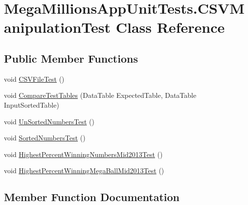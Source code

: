 \hypertarget{class_mega_millions_app_unit_tests_1_1_c_s_v_manipulation_test}{}\section{Mega\+Millions\+App\+Unit\+Tests.\+C\+S\+V\+Manipulation\+Test Class Reference}
\label{class_mega_millions_app_unit_tests_1_1_c_s_v_manipulation_test}
\subsection*{Public Member Functions}
\begin{DoxyCompactItemize}
\item 
void \hyperlink{class_mega_millions_app_unit_tests_1_1_c_s_v_manipulation_test_ad6a4b7ca874f3df6757bf6e1ce4b21c3}{C\+S\+V\+File\+Test} ()
\item 
void \hyperlink{class_mega_millions_app_unit_tests_1_1_c_s_v_manipulation_test_ae39c1add0a8ef2e94b35b41b8dea9a2d}{Compare\+Test\+Tables} (Data\+Table Expected\+Table, Data\+Table Input\+Sorted\+Table)
\item 
void \hyperlink{class_mega_millions_app_unit_tests_1_1_c_s_v_manipulation_test_a0502b3fc34243a20d14934b2aeb3b830}{Un\+Sorted\+Numbers\+Test} ()
\item 
void \hyperlink{class_mega_millions_app_unit_tests_1_1_c_s_v_manipulation_test_a68cebf82a0d4d9b9da2ba66007853b7b}{Sorted\+Numbers\+Test} ()
\item 
void \hyperlink{class_mega_millions_app_unit_tests_1_1_c_s_v_manipulation_test_a15312c6a07536aeb5480bb6e6be0f23e}{Highest\+Percent\+Winning\+Numbers\+Mid2013\+Test} ()
\item 
void \hyperlink{class_mega_millions_app_unit_tests_1_1_c_s_v_manipulation_test_adc9abfc8070c220fe1bf7d5b126a9fc4}{Highest\+Percent\+Winning\+Mega\+Ball\+Mid2013\+Test} ()
\end{DoxyCompactItemize}


\subsection{Member Function Documentation}
\mbox{\label{class_mega_millions_app_unit_tests_1_1_c_s_v_manipulation_test_ae39c1add0a8ef2e94b35b41b8dea9a2d}} 
